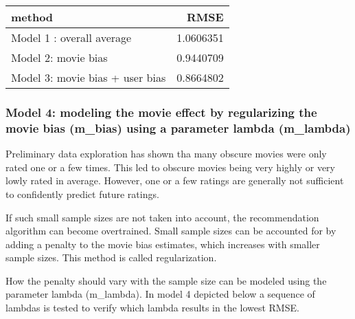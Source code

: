\documentclass[
]{article}
\begin{document}
\begin{longtable}[]{@{}lr@{}}
\toprule
method & RMSE\tabularnewline
\midrule
\endhead
Model 1 : overall average & 1.0606351\tabularnewline
Model 2: movie bias & 0.9440709\tabularnewline
Model 3: movie bias + user bias & 0.8664802\tabularnewline
\bottomrule
\end{longtable}

\hypertarget{model-4-modeling-the-movie-effect-by-regularizing-the-movie-bias-m_bias-using-a-parameter-lambda-m_lambda}{%
\subsubsection{Model 4: modeling the movie effect by regularizing the
movie bias (m\_bias) using a parameter lambda
(m\_lambda)}\label{model-4-modeling-the-movie-effect-by-regularizing-the-movie-bias-m_bias-using-a-parameter-lambda-m_lambda}}

Preliminary data exploration has shown tha many obscure movies were only
rated one or a few times. This led to obscure movies being very highly
or very lowly rated in average. However, one or a few ratings are
generally not sufficient to confidently predict future ratings.

If such small sample sizes are not taken into account, the
recommendation algorithm can become overtrained. Small sample sizes can
be accounted for by adding a penalty to the movie bias estimates, which
increases with smaller sample sizes. This method is called
regularization.

How the penalty should vary with the sample size can be modeled using
the parameter lambda (m\_lambda). In model 4 depicted below a sequence
of lambdas is tested to verify which lambda results in the lowest RMSE.
\end{document}
